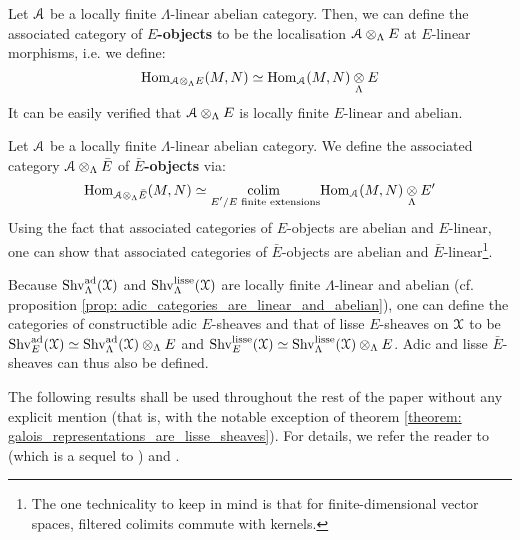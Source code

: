             \begin{definition}[$E$-objects] \label{def: E_objects}
                Let $\mathcal{A}$ be a locally finite $\Lambda$-linear abelian category. Then, we can define the associated category of \textbf{$E$-objects} to be the localisation $\calA \tensor_{\Lambda} E$ at $E$-linear morphisms, i.e. we define:
                    $$\Hom_{\calA \tensor_{\Lambda} E}(M, N) \cong \Hom_{\calA}(M, N) \tensor_{\Lambda} E$$
                It can be easily verified that $\calA \tensor_{\Lambda} E$ is locally finite $E$-linear and abelian.
            \end{definition}
            \begin{definition} \label{def: bar_E_objects}
                Let $\mathcal{A}$ be a locally finite $\Lambda$-linear abelian category. We define the associated category $\calA \tensor_{\Lambda} \bar{E}$ of \textbf{$\bar{E}$-objects} via:
                    $$\Hom_{\calA \tensor_{\Lambda} \bar{E}}(M, N) \cong \underset{\text{$E'/E$ finite extensions}}{\colim} \Hom_{\calA}(M, N) \tensor_{\Lambda} E'$$
                Using the fact that associated categories of $E$-objects are abelian and $E$-linear, one can show that associated categories of $\bar{E}$-objects are abelian and $\bar{E}$-linear\footnote{The one technicality to keep in mind is that for finite-dimensional vector spaces, filtered colimits commute with kernels.}. 
            \end{definition}
            \begin{example} \label{example: E_sheaves}
                Because $\mathrm{Shv}_{\Lambda}^{\mathrm{ad}}(\mathcal{X})$ and $\mathrm{Shv}_{\Lambda}^{\mathrm{lisse}}(\mathcal{X})$ are locally finite $\Lambda$-linear and abelian (cf. proposition \ref{prop: adic_categories_are_linear_and_abelian}), one can define the categories of constructible adic $E$-sheaves and that of lisse $E$-sheaves on $\mathcal{X}$ to be $\Shv_E^{\ad}(\calX) \cong \Shv_{\Lambda}^{\ad}(\calX) \tensor_{\Lambda} E$ and $\Shv_E^{\lisse}(\calX) \cong \Shv_{\Lambda}^{\lisse}(\calX) \tensor_{\Lambda} E$. Adic and lisse $\bar{E}$-sheaves can thus also be defined.
            \end{example}
            
            The following results shall be used throughout the rest of the paper without any explicit mention (that is, with the notable exception of theorem \ref{theorem: galois_representations_are_lisse_sheaves}). For details, we refer the reader to \cite[Sections 6-8]{laszlo_olsson_adic_sheaves_on_artin_stacks_2} (which is a sequel to \cite{laszlo_olsson_adic_sheaves_on_artin_stacks_1}) and \cite[Sections II.7-II.10]{kiehl_weissauer_weil_conjecture_perverse_sheaves_and_l_adic_fourier_transform}.
            
